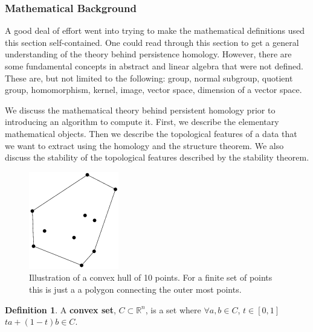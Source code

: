 \documentclass[12pt, a4paper, twocolumn, fullpage]{article}
\theoremstyle{plain}
\theoremstyle{definition}
\newtheorem{defn}{Definition}[section]
\theoremstyle{remark}
\begin{document}
\subsubsection{ Mathematical Background}

A good deal of effort went into trying to make the mathematical definitions used this section self-contained. One could read through this section to get a general understanding of the theory behind persistence homology. However, there are some fundamental concepts in abstract and linear algebra that were not defined. These are, but not limited to the following: group, normal subgroup, quotient group, homomorphism, kernel, image, vector space, dimension of a vector space.

We discuss the mathematical theory behind persistent homology prior to introducing an algorithm to compute it.  First, we describe the elementary mathematical objects. Then we describe the topological features of a data that we want to extract using the homology and the structure theorem. We also discuss the stability of the topological features described by the stability theorem.

\begin{figure}[t]
\centering
    \includegraphics[width=.6\linewidth]{img/mathDef/ConvexHull2D}
    \caption{Illustration of a convex hull of 10 points. For a finite set of points this is just a a polygon connecting the outer most points.}
    \label{ConvexHull}
\end{figure}

\begin{defn}
A \textbf{convex set}, $C \subset \mathbb{R}^n$, is a set where $\forall a,b \in C$, $t \in [0,1]$ $ta+(1-t)b \in C$.
\end{defn}
\end{document}
